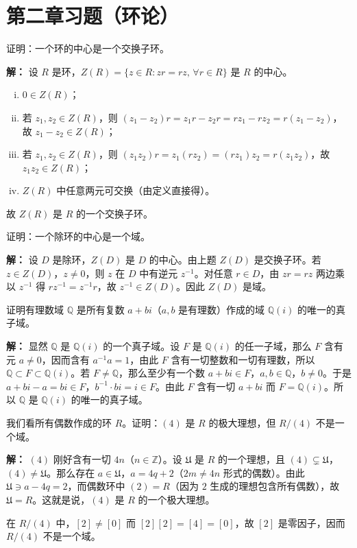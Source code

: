 \section{第二章习题（环论）}

\begin{example}[环的中心是交换子环]
证明：一个环的中心是一个交换子环。

\textbf{解：} 设 $R$ 是环，$Z(R)=\{z\in R:zr=rz,\,\forall r\in R\}$ 是 $R$ 的中心。
\begin{enumerate}[(i)]
  \item $0\in Z(R)$；
  \item 若 $z_1,z_2\in Z(R)$，则 $(z_1-z_2)r=z_1r-z_2r=rz_1-rz_2=r(z_1-z_2)$，故 $z_1-z_2\in Z(R)$；
  \item 若 $z_1,z_2\in Z(R)$，则 $(z_1z_2)r=z_1(rz_2)=(rz_1)z_2=r(z_1z_2)$，故 $z_1z_2\in Z(R)$；
  \item $Z(R)$ 中任意两元可交换（由定义直接得）。
\end{enumerate}
故 $Z(R)$ 是 $R$ 的一个交换子环。
\end{example}

\begin{example}[除环的中心是域]
证明：一个除环的中心是一个域。

\textbf{解：} 设 $D$ 是除环，$Z(D)$ 是 $D$ 的中心。由上题 $Z(D)$ 是交换子环。若 $z\in Z(D)$，$z\ne0$，则 $z$ 在 $D$ 中有逆元 $z^{-1}$。对任意 $r\in D$，由 $zr=rz$ 两边乘以 $z^{-1}$ 得 $rz^{-1}=z^{-1}r$，故 $z^{-1}\in Z(D)$。因此 $Z(D)$ 是域。
\end{example}

\begin{example}
证明有理数域 $\mathbb{Q}$ 是所有复数 $a+bi$（$a,b$ 是有理数）作成的域 $\mathbb{Q}(i)$ 的唯一的真子域。

\textbf{解：} 显然 $\mathbb{Q}$ 是 $\mathbb{Q}(i)$ 的一个真子域。设 $F$ 是 $\mathbb{Q}(i)$ 的任一子域，那么 $F$ 含有元 $a\ne0$，因而含有 $a^{-1}a=1$，由此 $F$ 含有一切整数和一切有理数，所以 $\mathbb{Q}\subset F\subset\mathbb{Q}(i)$。若 $F\ne\mathbb{Q}$，那么至少有一个数 $a+bi\in F$，$a,b\in\mathbb{Q}$，$b\ne0$。于是 $a+bi-a=bi\in F$，$b^{-1}\cdot bi=i\in F$。由此 $F$ 含有一切 $a+bi$ 而 $F=\mathbb{Q}(i)$。所以 $\mathbb{Q}$ 是 $\mathbb{Q}(i)$ 的唯一的真子域。
\end{example}

\begin{example}
我们看所有偶数作成的环 $R$。证明：$(4)$ 是 $R$ 的极大理想，但 $R/(4)$ 不是一个域。

\textbf{解：} $(4)$ 刚好含有一切 $4n$（$n\in\mathbb{Z}$）。设 $\mathfrak{U}$ 是 $R$ 的一个理想，且 $(4)\subsetneq\mathfrak{U}$，$(4)\ne\mathfrak{U}$。那么存在 $a\in\mathfrak{U}$，$a=4q+2$（$2m\ne4n$ 形式的偶数）。由此 $\mathfrak{U}\ni a-4q=2$，而偶数环中 $(2)=R$（因为 $2$ 生成的理想包含所有偶数），故 $\mathfrak{U}=R$。这就是说，$(4)$ 是 $R$ 的一个极大理想。

在 $R/(4)$ 中，$[2]\ne[0]$ 而 $[2][2]=[4]=[0]$，故 $[2]$ 是零因子，因而 $R/(4)$ 不是一个域。
\end{example}


